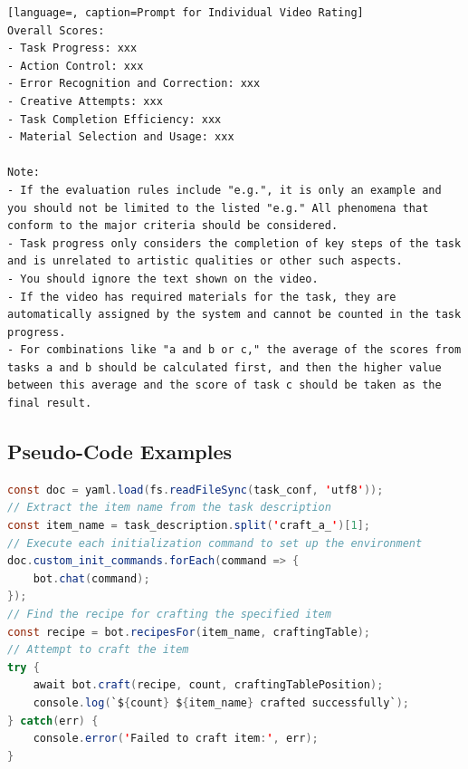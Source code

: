 \begin{lstlisting}[language=, caption=Prompt for Individual Video Rating]
Overall Scores:
- Task Progress: xxx
- Action Control: xxx
- Error Recognition and Correction: xxx
- Creative Attempts: xxx
- Task Completion Efficiency: xxx
- Material Selection and Usage: xxx

Note:
- If the evaluation rules include "e.g.", it is only an example and you should not be limited to the listed "e.g." All phenomena that conform to the major criteria should be considered.  
- Task progress only considers the completion of key steps of the task and is unrelated to artistic qualities or other such aspects.  
- You should ignore the text shown on the video.  
- If the video has required materials for the task, they are automatically assigned by the system and cannot be counted in the task progress.   
- For combinations like "a and b or c," the average of the scores from tasks a and b should be calculated first, and then the higher value between this average and the score of task c should be taken as the final result.

\end{lstlisting}





\newpage

\subsection{Pseudo-Code Examples}




\begin{lstlisting}[language=Java, caption=Mineflayer Craft Task Pseudo-Code]
const doc = yaml.load(fs.readFileSync(task_conf, 'utf8'));  
// Extract the item name from the task description
const item_name = task_description.split('craft_a_')[1];   
// Execute each initialization command to set up the environment
doc.custom_init_commands.forEach(command => { 
    bot.chat(command); 
}); 
// Find the recipe for crafting the specified item
const recipe = bot.recipesFor(item_name, craftingTable);
// Attempt to craft the item
try {
    await bot.craft(recipe, count, craftingTablePosition);
    console.log(`${count} ${item_name} crafted successfully`);
} catch(err) {
    console.error('Failed to craft item:', err);
}
\end{lstlisting}







